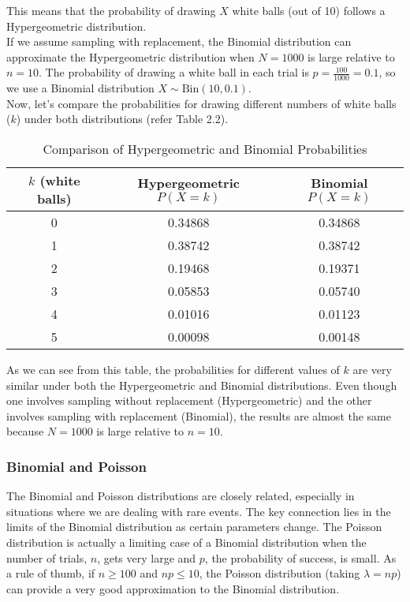 This means that the probability of drawing \( X \) white balls (out of 10) follows a Hypergeometric distribution.\\

If we assume sampling with replacement, the Binomial distribution can approximate the Hypergeometric distribution when \( N = 1000 \) is large relative to \( n = 10 \). The probability of drawing a white ball in each trial is \( p = \frac{100}{1000} = 0.1 \), so we use a Binomial distribution \( X \sim \text{Bin}(10, 0.1) \).\\

Now, let's compare the probabilities for drawing different numbers of white balls (\( k \)) under both distributions (refer Table 2.2). \\

\begin{table}[h]
    \centering
    \begin{tabular}{|c|c|c|}
        \hline
        \( k \) (white balls) & Hypergeometric \( P(X = k) \) & Binomial \( P(X = k) \) \\
        \hline
        0 & 0.34868 & 0.34868 \\
        1 & 0.38742 & 0.38742 \\
        2 & 0.19468 & 0.19371 \\
        3 & 0.05853 & 0.05740 \\
        4 & 0.01016 & 0.01123 \\
        5 & 0.00098 & 0.00148 \\
        \hline
    \end{tabular}
    \caption{Comparison of Hypergeometric and Binomial Probabilities}
\end{table}

As we can see from this table, the probabilities for different values of \( k \) are very similar under both the Hypergeometric and Binomial distributions. Even though one involves sampling without replacement (Hypergeometric) and the other involves sampling with replacement (Binomial), the results are almost the same because \( N = 1000 \) is large relative to \( n = 10 \).

\subsubsection{Binomial and Poisson}

The Binomial and Poisson distributions are closely related, especially in situations where we are dealing with rare events. The key connection lies in the limits of the Binomial distribution as certain parameters change. The Poisson distribution is actually a limiting case of a Binomial distribution when the number of trials, \( n \), gets very large and \( p \), the probability of success, is small. As a rule of thumb, if \( n \geq 100 \) and \( np \leq 10 \), the Poisson distribution (taking \( \lambda = np \)) can provide a very good approximation to the Binomial distribution.\\

